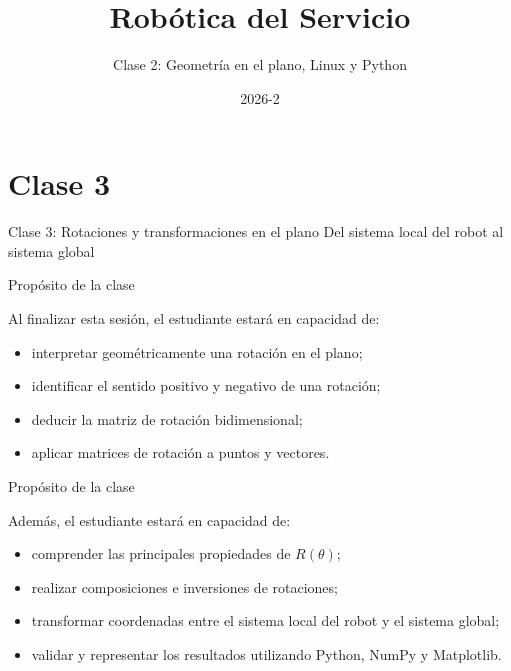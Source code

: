 \documentclass[aspectratio=169]{beamer}
\title{Robótica del Servicio}
\subtitle{Clase 2: Geometría en el plano, Linux y Python}
\author{\Instructor}
\institute{\Institution\\\Faculty}
\date{2026-2}
\begin{document}
\TitleSlide
\NormasSlide

\section{Clase 3}

\SectionSlide
{Clase 3: Rotaciones y transformaciones en el plano}
{Del sistema local del robot al sistema global}

\begin{frame}{Propósito de la clase}

    Al finalizar esta sesión, el estudiante estará en capacidad de:

    \begin{itemize}
        \item interpretar geométricamente una rotación en el plano;
        \item identificar el sentido positivo y negativo de una rotación;
        \item deducir la matriz de rotación bidimensional;
        \item aplicar matrices de rotación a puntos y vectores.
    \end{itemize}

    \vspace{0.3cm}


\end{frame}

\begin{frame}{Propósito de la clase}

    Además, el estudiante estará en capacidad de:

    \begin{itemize}
        \item comprender las principales propiedades de $R(\theta)$;
        \item realizar composiciones e inversiones de rotaciones;
        \item transformar coordenadas entre el sistema local del robot y el sistema global;
        \item validar y representar los resultados utilizando Python, NumPy y Matplotlib.
    \end{itemize}

    \vspace{0.3cm}


\end{frame}
\end{document}
